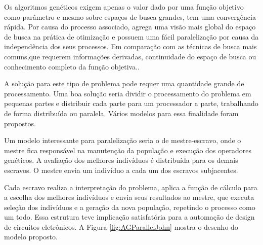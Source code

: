 Os algoritmos genéticos exigem apenas o valor dado por uma função objetivo como parâmetro e mesmo sobre espaços de busca grandes, tem uma convergência rápida. Por causa do processo associado, agrega uma visão mais global do espaço de busca na prática de otimização e possuem uma fácil paralelização por causa da independência dos seus processos. Em comparação com as técnicas de busca mais comuns,que requerem informações derivadas, continuidade do espaço de busca ou conhecimento completo da função objetiva.\cite{Vilson}.

A solução para este tipo de problema pode requer uma quantidade grande de processamento. Uma boa solução seria dividir o processamento do problema em pequenas partes e distribuir cada parte para um processador a parte, trabalhando de forma distribuída ou paralela. Vários modelos para essa finalidade foram propostos.

Um modelo interessante para paralelização seria o de mestre-escravo, onde o mestre fica responsável na manutenção da população e execução dos operadores genéticos. A avaliação dos melhores indivíduos é distribuída para os demais escravos. O mestre envia um indivíduo a cada um dos escravos subjacentes. 

Cada escravo realiza a interpretação do problema, aplica a função de cálculo para a escolha dos melhores indivíduos e envia seus resultados ao mestre, que executa seleção dos indivíduos e a geração da nova população, repetindo o processo como um todo. Essa estrutura teve implicação satisfatória para a automação de design de circuitos eletrônicos\cite{Jason}. A Figura \ref{fig:AGParallelJohn} mostra o desenho do modelo proposto.

\begin{minipage}{\linewidth}
	\label{fig:AGParallelJohn}
\end{minipage}

